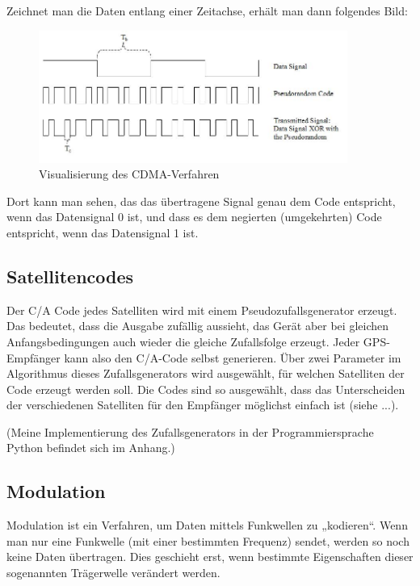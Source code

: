 \documentclass[12pt,a4paper]{scrartcl}
\begin{document}
Zeichnet man die Daten entlang einer Zeitachse, erhält man dann folgendes Bild:

\begin{figure}[H]
\centering
\includegraphics[width=0.9\textwidth]{img/Generation_of_CDMA.jpg}
\caption{Visualisierung des CDMA-Verfahren\cite{commons_cdma}}
\label{fig:cdma}
\end{figure}

Dort kann man sehen, das das übertragene Signal genau dem Code entspricht, wenn das Datensignal 0 ist, und dass es dem negierten (umgekehrten) Code entspricht, wenn das Datensignal 1 ist.

\subsection{Satellitencodes}

Der C/A Code jedes Satelliten wird mit einem Pseudozufallsgenerator erzeugt. Das bedeutet, dass die Ausgabe zufällig aussieht, das Gerät aber bei gleichen Anfangsbedingungen auch wieder die gleiche Zufallsfolge erzeugt. Jeder GPS-Empfänger kann also den C/A-Code selbst generieren. Über zwei Parameter im Algorithmus dieses Zufallsgenerators wird ausgewählt, für welchen Satelliten der Code erzeugt werden soll. Die Codes sind so ausgewählt, dass das Unterscheiden der verschiedenen Satelliten für den Empfänger möglichst einfach ist (siehe ...).

(Meine Implementierung des Zufallsgenerators in der Programmiersprache Python befindet sich im Anhang.)

\subsection{Modulation}

Modulation ist ein Verfahren, um Daten mittels Funkwellen zu „kodieren“.
Wenn man nur eine Funkwelle (mit einer bestimmten Frequenz) sendet, werden so noch keine Daten übertragen. Dies geschieht erst, wenn bestimmte Eigenschaften dieser sogenannten Trägerwelle verändert werden.
\end{document}
